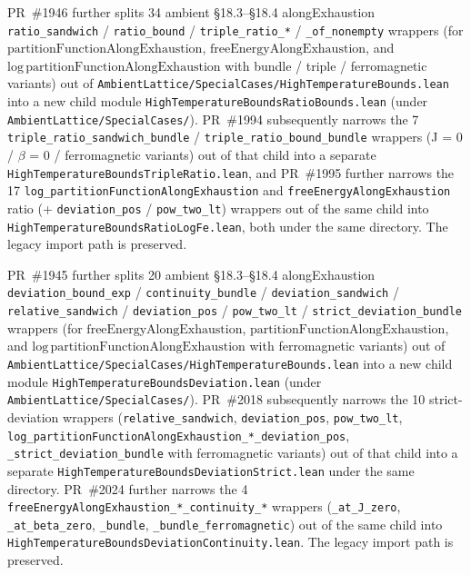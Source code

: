 \documentclass[a4paper,11pt]{article}
\begin{document}
PR~\#1946 further splits 34 ambient §18.3--§18.4 alongExhaustion
\texttt{ratio\_sandwich} / \texttt{ratio\_bound} /
\texttt{triple\_ratio\_*} / \texttt{\_of\_nonempty} wrappers (for
$\mathrm{partitionFunctionAlongExhaustion}$,
$\mathrm{freeEnergyAlongExhaustion}$, and
$\mathrm{log}\,\mathrm{partitionFunctionAlongExhaustion}$ with
bundle / triple / ferromagnetic variants) out of
\texttt{AmbientLattice/SpecialCases/HighTemperatureBounds.lean} into
a new child module
\texttt{HighTemperatureBoundsRatioBounds.lean} (under
\texttt{AmbientLattice/SpecialCases/}). PR~\#1994 subsequently narrows
the 7 \texttt{triple\_ratio\_sandwich\_bundle} /
\texttt{triple\_ratio\_bound\_bundle} wrappers (J = 0 / $\beta$ = 0 /
ferromagnetic variants) out of that child into a separate
\texttt{HighTemperatureBoundsTripleRatio.lean}, and PR~\#1995 further
narrows the 17 \texttt{log\_partitionFunctionAlongExhaustion} and
\texttt{freeEnergyAlongExhaustion} ratio (+
\texttt{deviation\_pos} / \texttt{pow\_two\_lt}) wrappers out of the
same child into \texttt{HighTemperatureBoundsRatioLogFe.lean}, both
under the same directory. The legacy import path is preserved.

PR~\#1945 further splits 20 ambient §18.3--§18.4 alongExhaustion
\texttt{deviation\_bound\_exp} / \texttt{continuity\_bundle} /
\texttt{deviation\_sandwich} / \texttt{relative\_sandwich} /
\texttt{deviation\_pos} / \texttt{pow\_two\_lt} /
\texttt{strict\_deviation\_bundle} wrappers (for
$\mathrm{freeEnergyAlongExhaustion}$,
$\mathrm{partitionFunctionAlongExhaustion}$, and
$\mathrm{log}\,\mathrm{partitionFunctionAlongExhaustion}$ with
ferromagnetic variants) out of
\texttt{AmbientLattice/SpecialCases/HighTemperatureBounds.lean} into
a new child module
\texttt{HighTemperatureBoundsDeviation.lean} (under
\texttt{AmbientLattice/SpecialCases/}). PR~\#2018 subsequently
narrows the 10 strict-deviation wrappers
(\texttt{relative\_sandwich}, \texttt{deviation\_pos},
\texttt{pow\_two\_lt},
\texttt{log\_partitionFunctionAlongExhaustion\_*\_deviation\_pos},
\texttt{\_strict\_deviation\_bundle} with ferromagnetic variants)
out of that child into a separate
\texttt{HighTemperatureBoundsDeviationStrict.lean} under the same
directory. PR~\#2024 further narrows the 4
\texttt{freeEnergyAlongExhaustion\_*\_continuity\_*} wrappers
(\texttt{\_at\_J\_zero}, \texttt{\_at\_beta\_zero},
\texttt{\_bundle}, \texttt{\_bundle\_ferromagnetic}) out of the
same child into
\texttt{HighTemperatureBoundsDeviationContinuity.lean}. The legacy
import path is preserved.
\end{document}
